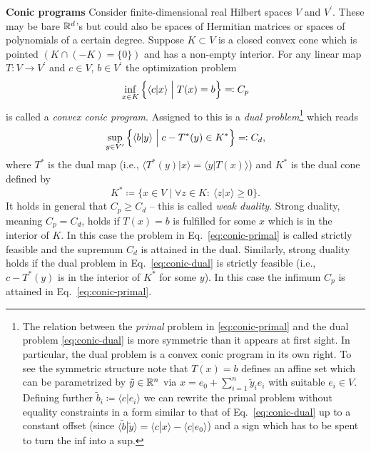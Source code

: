 \documentclass[11pt,a4paper]{article}
\numberwithin{equation}{section}
\begin{document}
\noindent\textbf{Conic programs}
Consider finite-dimensional real Hilbert spaces $V$ and $V^\prime$. These may
be bare $\mathbb{R}^d$'s but could also be spaces of Hermitian matrices or spaces of
polynomials of a certain degree. Suppose $K\subset V$ is a closed convex cone
which is pointed $(K\cap (-K)=\{0\})$ and has a non-empty interior. For any
linear map $T:V\to V^\prime$ and $c\in V$, $b\in V^\prime$ the optimization
problem
\begin{equation}\label{eq:conic-primal}
    \inf_{x\in K}\left\{\langle c|x\rangle \Bigm| T(x)=b\right\} \eqqcolon C_p
\end{equation}
is called a \emph{convex conic program}. Assigned to this is a \emph{dual
    problem}\footnote{The relation between the \emph{primal} problem in
    \eqref{eq:conic-primal} and the dual problem \eqref{eq:conic-dual} is more
    symmetric than it appears at first sight. In particular, the dual problem is a
    convex conic program in its own right. To see the symmetric structure note that
    $T(x)=b$ defines an affine set which can be parametrized by
    $\tilde{y}\in \mathbb{R}^n$ via $x=e_0+\sum_{i=1}^n \tilde{y}_i e_i$ with suitable
    $e_i\in V$. Defining further $\tilde{b}_i \coloneqq \langle c|e_i\rangle$ we can
    rewrite the primal problem without equality constraints in a form similar to
    that of Eq.~\eqref{eq:conic-dual} up to a constant offset (since
    $\langle \tilde{b}|\tilde{y}\rangle=\langle c|x\rangle-\langle c|e_0\rangle$)
    and a sign which has to be spent to turn the inf into a sup.}
which reads
\begin{equation}\label{eq:conic-dual}
    \sup_{y\in V^\prime}\left\{\langle b|y\rangle \Bigm| c-T^{*}(y)\in K^{*}\right\}
    \eqqcolon C_d,
\end{equation}
where $T^{*}$ is the dual map (i.e., $\langle T^{*}(y)|x\rangle=\langle y|T(x)\rangle$)
and $K^{*}$ is the dual cone defined by
\[
    K^{*} \coloneqq \{x\in V \mid \forall z\in K:\ \langle z|x\rangle \ge 0\}.
\]
It holds in general that $C_p\ge C_d$ -- this is called \emph{weak duality}.
Strong duality, meaning $C_p=C_d$, holds if $T(x)=b$ is fulfilled for some $x$
which is in the interior of $K$. In this case the problem in
Eq.~\eqref{eq:conic-primal} is called strictly feasible and the supremum $C_d$
is attained in the dual. Similarly, strong duality holds if the dual problem in
Eq.~\eqref{eq:conic-dual} is strictly feasible (i.e., $c-T^{*}(y)$ is in the
interior of $K^{*}$ for some $y$). In this case the infimum $C_p$ is attained
in Eq.~\eqref{eq:conic-primal}.
\end{document}
